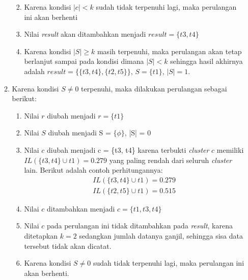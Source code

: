 \documentclass[a4paper,twoside]{article}
\begin{document}
\begin{enumerate}
\begin{enumerate}
\begin{enumerate}
\begin{enumerate}
\end{enumerate}
\item Karena kondisi $|c| < k$ sudah tidak terpenuhi lagi, maka perulangan ini akan berhenti
\item Nilai \textit{result} akan ditambahkan menjadi $result = \{t3, t4\}$
\item Karena kondisi $|S| \geq k$ masih terpenuhi, maka perulangan akan tetap berlanjut sampai pada kondisi dimana $|S| < k$ sehingga hasil akhirnya adalah $result = \{\{t3, t4\}, \{t2, t5\}\}$, $S = \{t1\}$, $|S| = 1$.

\end{enumerate}

\item Karena kondisi $S \neq 0$ terpenuhi, maka dilakukan perulangan sebagai berikut:

\begin{enumerate}
\item Nilai $r$ diubah menjadi $r = \{t1\}$

\item Nilai $S$ diubah menjadi S = $\{\phi\}$, |S| = 0

\item Nilai $c$ diubah menjadi c = \{t3, t4\} karena terbukti \textit{cluster} $c$ memiliki $IL(\{t3,t4\} \cup t1)=0.279$ yang paling rendah dari seluruh \textit{cluster} lain. Berikut adalah contoh perhitungannya:
\begin{align*}
IL(\{t3,t4\} \cup t1) = 0.279 \\
IL(\{t2,t5\}\cup t1) = 0.515 
\end{align*}

\item Nilai $c$ ditambahkan menjadi $c = \{t1, t3, t4\}$

\item Nilai $c$ pada perulangan ini tidak ditambahkan pada \textit{result}, karena  ditetapkan $k = 2$ sedangkan jumlah datanya ganjil, sehingga sisa data tersebut tidak akan dicatat.

\item Karena kondisi $S \neq 0$ sudah tidak terpenuhi lagi, maka perulangan ini akan berhenti.

\end{enumerate}


\end{enumerate}
\end{enumerate}
\end{document}
